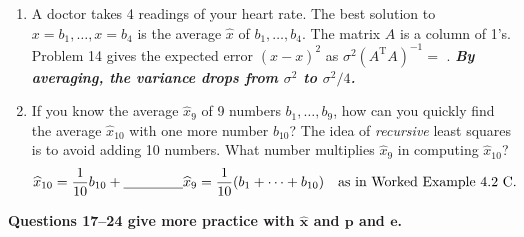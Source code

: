 \documentclass[14pt, a4paper]{article}
\begin{document}
\begin{enumerate}[resume]
    \item A doctor takes 4 readings of your heart rate. The best solution to $x = b_1, \dots, x = b_4$ is the average $\widehat{x}$ of $b_1, \dots, b_4$. The matrix $A$ is a column of 1's. Problem 14 gives the expected error $(\widehat{x} - x)^2$ as $\sigma^2(A^{\mathrm{T}}A)^{-1} =$ \underline{\hspace{2cm}}. \textbf{\emph{By averaging, the variance drops from $\sigma^2$ to $\sigma^2/4$.}}

    \item If you know the average $\widehat{x}_9$ of 9 numbers $b_1, \dots, b_9$, how can you quickly find the average $\widehat{x}_{10}$ with one more number $b_{10}$? The idea of \emph{recursive} least squares is to avoid adding 10 numbers. What number multiplies $\widehat{x}_9$ in computing $\widehat{x}_{10}$?
          \[
              \widehat{x}_{10} = \frac{1}{10}b_{10} + \underline{\hspace{1.5cm}} \widehat{x}_9 = \frac{1}{10}(b_1 + \cdots + b_{10}) \quad \text{as in Worked Example 4.2 C.}
          \]
\end{enumerate}

\noindent \textbf{Questions 17--24 give more practice with $\widehat{\boldsymbol{x}}$ and $\boldsymbol{p}$ and $\boldsymbol{e}$.}
\end{document}

